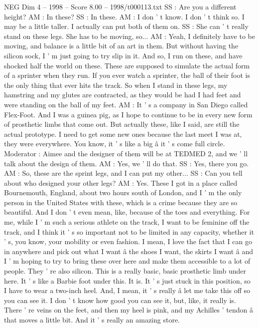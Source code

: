 \begin{textsample}{NEG Dim 4 – 1998 – Score 8.00 – 1998/t000113.txt}
SS : Are you a different height?
AM : In these?
SS : In these.
AM : I don ' t know.
I don ' t think so.
I may be a little taller.
I actually can put both of them on.
SS : She can ' t really stand on these legs.
She has to be moving, so...
AM : Yeah, I definitely have to be moving, and balance is a little bit of an art in them.
But without having the silicon sock, I ' m just going to try slip in it.
And so, I run on these, and have shocked half the world on these.
These are supposed to simulate the actual form of a sprinter when they run.
If you ever watch a sprinter, the ball of their foot is the only thing that ever hits the track.
So when I stand in these legs, my hamstring and my glutes are contracted, as they would be had I had feet and were standing on the ball of my feet.
AM : It ' s a company in San Diego called Flex-Foot.
And I was a guinea pig, as I hope to continue to be in every new form of prosthetic limbs that come out.
But actually these, like I said, are still the actual prototype.
I need to get some new ones because the last meet I was at, they were everywhere.
You know, it ' s like a big â it ' s come full circle.
Moderator : Aimee and the designer of them will be at TEDMED 2, and we ' ll talk about the design of them.
AM : Yes, we ' ll do that.
SS : Yes, there you go.
AM : So, these are the sprint legs, and I can put my other...
SS : Can you tell about who designed your other legs?
AM : Yes.
These I got in a place called Bournemouth, England, about two hours south of London, and I ' m the only person in the United States with these, which is a crime because they are so beautiful.
And I don ' t even mean, like, because of the toes and everything.
For me, while I ' m such a serious athlete on the track, I want to be feminine off the track, and I think it ' s so important not to be limited in any capacity, whether it ' s, you know, your mobility or even fashion.
I mean, I love the fact that I can go in anywhere and pick out what I want â the shoes I want, the skirts I want â and I ' m hoping to try to bring these over here and make them accessible to a lot of people.
They ' re also silicon.
This is a really basic, basic prosthetic limb under here.
It ' s like a Barbie foot under this.
It is.
It ' s just stuck in this position, so I have to wear a two-inch heel.
And, I mean, it ' s really â let me take this off so you can see it.
I don ' t know how good you can see it, but, like, it really is.
There ' re veins on the feet, and then my heel is pink, and my Achilles ' tendon â that moves a little bit.
And it ' s really an amazing store.

\end{textsample}
